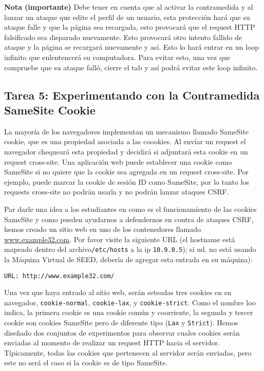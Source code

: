 \textbf{Nota (importante)} Debe tener en cuenta que al activar la contramedida y al lanzar un ataque que edite el perfil de un usuario, esta protección hará que su ataque falle y que la página sea recargada, esto provocará que el request HTTP falsificado sea disparado nuevamente. Esto provocará otro intento fallido de ataque y la página se recargará nuevamente y así. Esto lo hará entrar en un loop infinito que enlentencerá su computadora. Para evitar esto, una vez que compruebe que su ataque falló, cierre el tab y así podrá evitar este loop infinito.



\subsection{Tarea 5: Experimentando con la Contramedida SameSite Cookie} 

La mayoría de los navegadores implementan un mecanismo llamado SameSite cookie, que es una propiedad asociada a las coookies. Al envíar un request el navegador chequeará esta propiedad y decidirá si adjuntará esta cookie en un request cross-site. Una aplicación web puede establecer una cookie como SameSite si no quiere que la cookie sea agregada en un request cross-site. Por ejemplo, puede marcar la cookie de sesión ID como SameSite, por lo tanto los requests cross-site no podrán usarla y no podrán lanzar ataques CSRF.

Par darle una idea a los estudiantes en como es el funcionamiento de las cookies SameSite y como pueden ayudarnos a defendernos en contra de ataques CSRF, hemos creado un sitio web en uno de los contenedores llamado \url{www.example32.com}. Por favor visite la siguiente URL (el hostname está mapeado dentro del archivo\texttt{/etc/hosts} a la ip \texttt{10.9.0.5}); si ud. no está usando la Máquina Virtual de SEED, debería de agregar esta entrada en su máquina):

\begin{lstlisting}
URL: http://www.example32.com/
\end{lstlisting}

Una vez que haya entrado al sitio web, serán seteadas tres cookies en su navegador, \texttt{cookie-normal}, \texttt{cookie-lax},
y \texttt{cookie-strict}. Como el nombre loo indica, la primera cookie es una cookie común y coorriente, la segunda y tercer cookie son cookies SameSite pero de diferente tipo (\texttt{Lax} y \texttt{Strict}). Hemos diseñado dos conjuntos de experimentos para observar cuales cookies serán enviadas al momento de realizar un request HTTP hacia el servidor. Típicamente, todas las cookies que pertenecen al servidor serán enviadas, pero este no será el caso si la cookie es de tipo SameSite.

